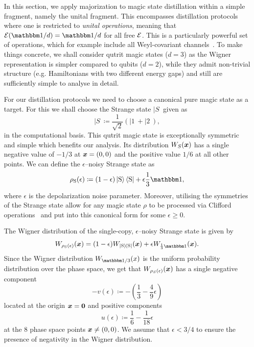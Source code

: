 \documentclass[pra,
aps,
twocolumn,
superscriptaddress,
groupedaddress,
nofootinbib,
reprint
]{revtex4-1}
\begin{document}
In this section, we apply majorization to magic state distillation within a simple fragment, namely the unital fragment. This encompasses distillation protocols where one is restricted to \emph{unital operations}, meaning that $\E(\I/d) = \I/d$ for all free ${\mathcal E}$. This is a particularly powerful set of operations, which for example include all Weyl-covariant channels~\cite{cit:gross3}. To make things concrete, we shall consider qutrit magic states ($d=3$) as the Wigner representation is simpler compared to qubits ($d=2$), while they admit non-trivial structure (e.g. Hamiltonians with two different energy gaps) and still are sufficiently simple to analyse in detail.

For our distillation protocols we need to choose a canonical pure magic state as a target. For this we shall choose the Strange state $|S\>$ given as
\begin{equation}
|S\> \coloneqq \frac{1}{\sqrt{2}} (|1\> + |2\>),
\end{equation}
in the computational basis. This qutrit magic state is exceptionally symmetric and simple which benefits our analysis. Its distribution $W_S(\boldsymbol{x})$ has a single negative value of $-1/3$ at $\boldsymbol{x} =(0,0)$ and the positive value $1/6$ at all other points. We can define the $\epsilon$--noisy Strange state as
\begin{equation}\label{eq:noisysn}
    \rho_{\rm{S}}(\epsilon)\coloneqq (1 - \epsilon) \ket{\rm{S}}\bra{\rm{S}} + \epsilon \frac{1}{3}\id,
\end{equation}
where $\epsilon$ is the depolarization noise parameter. Moreover, utilising the symmetries of the Strange state allow for any magic state $\rho$ to be processed via Clifford operations~\cite{cit:prakash,cit:prakash2} and put into this canonical form for some $\epsilon \ge 0$.

The Wigner distribution of the single-copy, $\epsilon$--noisy Strange state  is given by
\begin{equation}
	\W[\bmx]{\rho_{\rm{S}}(\epsilon)} = (1-\epsilon)\W[\bmx]{\ketbra{\rm{S}}} + \epsilon\W[\bmx]{\frac{1}{3}\id}.
\end{equation}
Since the Wigner distribution $W_{\I/3}(x)$ is the uniform probability distribution over the phase space, we get that $W_{\rho_S(\epsilon) } (\boldsymbol{x})$ has a single negative component
\begin{equation}
	- v(\epsilon) \coloneqq - \left( \frac{1}{3} -\frac{4}{9}\epsilon \right)
\end{equation} 
located at the origin $\bm{x} = \bm{0}$ and positive components
\begin{equation}
	u(\epsilon) \coloneqq \frac{1}{6} -\frac{1}{18}\epsilon
\end{equation}
at the 8 phase space points $\boldsymbol{x} \ne (0,0)$. We assume that $\epsilon < 3/4$ to ensure the presence of negativity in the Wigner distribution. 
\end{document}
